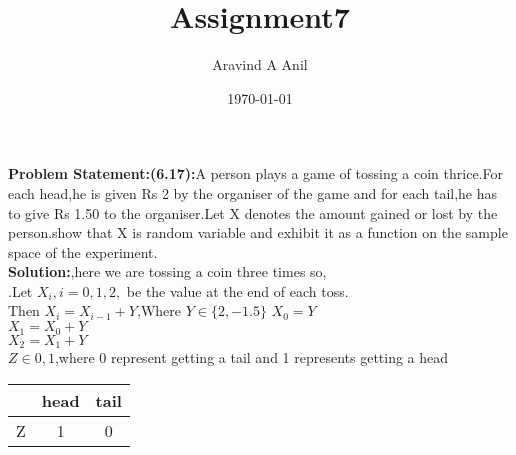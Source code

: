 \documentclass[11pt,a4paper,twocolumn]{article}
\title{Assignment7}
\author{Aravind A Anil}
\date{\today}
\begin{document}
\maketitle
\textbf{Problem Statement:(6.17):}A person plays a game of tossing a coin thrice.For each head,he is given Rs 2 by the organiser of the game and for each tail,he has to give Rs 1.50 to the organiser.Let X denotes the amount gained or lost by the person.show that X is random variable and exhibit it as a function on the sample space of the experiment.\\
\textbf{Solution:},here we are tossing a coin three times so,\\
.Let $X_i,i=0,1,2,$ be the value at the end of each toss.\\Then $X_i=X_{i-1}+Y$,Where $Y\in\{2,-1.5\}$ 
$X_{0}=Y$\\
$X_{1}=X_{0}+Y$\\
$X_{2}=X_{1}+Y$\\
$Z\in{0,1}$,where 0 represent getting a tail and 1 represents getting a head
\begin{table}[ht]
    \centering
    \begin{tabular}{|c|c|c|}
\hline
     &head&tail  \\
     \hline
     Z&1&0\\
     \hline
\end{tabular}
\end{table}
\end{document}
